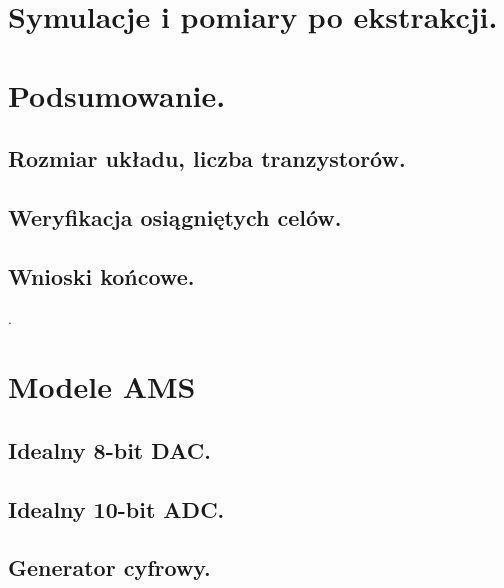 \documentclass[10pt,a4paper]{report}
\theoremstyle{definition}
\theoremstyle{definition}
\theoremstyle{definition}
\theoremstyle{definition}
\theoremstyle{definition}
\begin{document}
	\chapter{Symulacje i pomiary po ekstrakcji.}
	
	\chapter{Podsumowanie.}
	\section{Rozmiar układu, liczba tranzystorów.}
	\section{Weryfikacja osiągniętych celów.}
	\section{Wnioski końcowe.}	

	
	\appendix
.	\chapter{Modele AMS}
	\section{Idealny 8-bit DAC.}
	\section{Idealny 10-bit ADC.}
	\section{Generator cyfrowy.}
	
\end{document}
